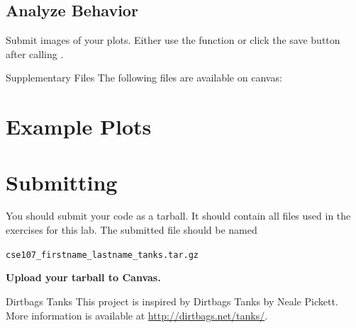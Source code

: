 \documentclass[11pt]{cselabheader}
\begin{document}
\subsection{Analyze Behavior}
\begin{ex}[...]
\end{ex}

\begin{ex}
\end{ex}

\begin{ex}[plots]
Submit images of your plots. Either use the 
function or click the save button after calling
.
\end{ex}

\begin{infobox}{Supplementary Files}
The following files are available on canvas:
\end{infobox}

\section{Example Plots}

\newpage
\section{Submitting}

You should submit your code as a tarball.  It should contain all files
used in the exercises for this lab.  The submitted file should be
named
\begin{center}
  \texttt{cse107\_firstname\_lastname\_tanks.tar.gz}
\end{center}

\begin{center}
  \textbf{Upload your tarball to Canvas.}
\end{center}

\listofexercises

\begin{warningbox}{Dirtbags Tanks}
  This project is inspired by Dirtbags Tanks by Neale Pickett.
  More information is available at \url{http://dirtbags.net/tanks/}.
\end{warningbox}
\end{document}
